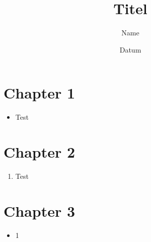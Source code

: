\documentclass{beamer}
\author{Name}
\title{Titel}
\institute{Julius-Maximilians-Universität Würzburg }
\date{Datum}
\begin{document}
	\begin{frame}
    \titlepage
    \end{frame}

	
	\begin{frame}
		\tableofcontents[sectionstyle=show,subsectionstyle=show/shaded/hide,subsubsectionstyle=show/shaded/hide]
	\end{frame}
		
	
	\section{Chapter 1}
		    \begin{frame}
			    \begin{itemize} 
			    \item Test
			    \end{itemize}
		    \end{frame}
	
	\section{Chapter 2}
		    \begin{frame}
			    \begin{enumerate}
			    \item Test
			    \end{enumerate}	
		    \end{frame}
	
	\section{Chapter 3}
	
	\begin{frame}
		\begin{itemize}
		\item 1
		\end{itemize}
	\end{frame}
		
\end{document}
